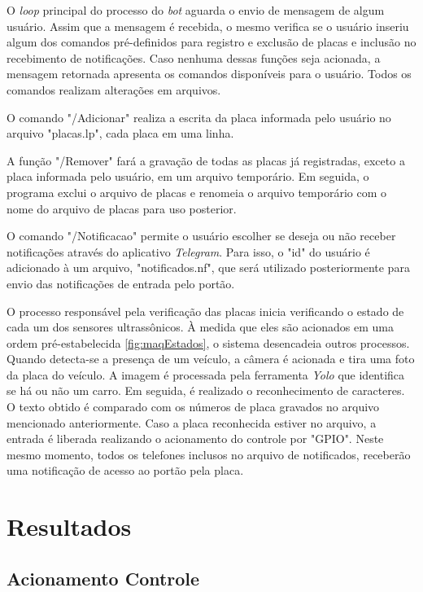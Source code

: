 \documentclass[conference]{IEEEtran}
\begin{document}
\begin{itemize}
O \textit{loop} principal do processo do \textit{bot} aguarda o envio de mensagem de algum usuário. Assim que a mensagem é recebida, o mesmo verifica se o usuário inseriu algum dos comandos pré-definidos para registro e exclusão de placas e inclusão no recebimento de notificações. Caso nenhuma dessas funções seja acionada, a mensagem retornada apresenta os comandos disponíveis para o usuário. Todos os comandos realizam alterações em arquivos. 

O comando "/Adicionar" realiza a escrita da placa informada pelo usuário no arquivo "placas.lp", cada placa em uma linha. 

A função "/Remover" fará a gravação de todas as placas já registradas, exceto a placa informada pelo usuário, em um arquivo temporário. Em seguida, o programa exclui o arquivo de placas e renomeia o arquivo temporário com o nome do arquivo de placas para uso posterior. 

O comando "/Notificacao" permite o usuário escolher se deseja ou não receber notificações através do aplicativo \textit{Telegram}. Para isso, o "id" do usuário é adicionado à um arquivo, "notificados.nf", que será utilizado posteriormente para envio das notificações de entrada pelo portão. 

O processo responsável pela verificação das placas inicia verificando o estado de cada um dos sensores ultrassônicos. À medida que eles são acionados em uma ordem pré-estabelecida \ref{fig:maqEstados}, o sistema desencadeia outros processos. Quando detecta-se a presença de um veículo, a câmera é acionada e tira uma foto da placa do veículo. A imagem é processada pela ferramenta \textit{Yolo} que identifica se há ou não um carro. Em seguida, é realizado o reconhecimento de caracteres. O texto obtido é comparado com os números de placa gravados no arquivo mencionado anteriormente. Caso a placa reconhecida estiver no arquivo, a entrada é liberada realizando o acionamento do controle por "GPIO". Neste mesmo momento, todos os telefones inclusos no arquivo de notificados, receberão uma notificação de acesso ao portão pela placa. 

\section{Resultados}

\subsection{Acionamento Controle}


\end{itemize}
\end{document}
